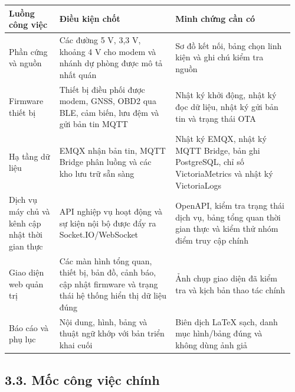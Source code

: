 \documentclass[a4paper]{extarticle}
\newcounter{none} %
\begin{document}
{\def\LTcaptype{none} %
\begin{longtable}{|L{0.170\linewidth}|L{0.390\linewidth}|L{0.400\linewidth}|}
\hline
\textbf{Luồng công việc} & \textbf{Điều kiện chốt} & \textbf{Minh chứng cần có} \\
\hline
\endhead
\endfoot
\endlastfoot
Phần cứng và nguồn & Các đường 5 V, 3,3 V, khoảng 4 V cho modem và nhánh dự phòng được mô tả nhất quán & Sơ đồ kết nối, bảng chọn linh kiện và ghi chú kiểm tra nguồn \\\hline
Firmware thiết bị & Thiết bị điều phối được modem, GNSS, OBD2 qua BLE, cảm biến, lưu đệm và gửi bản tin MQTT & Nhật ký khởi động, nhật ký đọc dữ liệu, nhật ký gửi bản tin và trạng thái OTA \\\hline
Hạ tầng dữ liệu & EMQX nhận bản tin, MQTT Bridge phân luồng và các kho lưu trữ sẵn sàng & Nhật ký EMQX, nhật ký MQTT Bridge, bản ghi PostgreSQL, chỉ số VictoriaMetrics và nhật ký VictoriaLogs \\\hline
Dịch vụ máy chủ và kênh cập nhật thời gian thực & API nghiệp vụ hoạt động và sự kiện nội bộ được đẩy ra Socket.IO/WebSocket & OpenAPI, kiểm tra trạng thái dịch vụ, bảng tổng quan thời gian thực và kiểm thử nhóm điểm truy cập chính \\\hline
Giao diện web quản trị & Các màn hình tổng quan, thiết bị, bản đồ, cảnh báo, cập nhật firmware và trạng thái hệ thống hiển thị dữ liệu đúng & Ảnh chụp giao diện đã kiểm tra và kịch bản thao tác chính \\\hline
Báo cáo và phụ lục & Nội dung, hình, bảng và thuật ngữ khớp với bản triển khai cuối & Biên dịch LaTeX sạch, danh mục hình/bảng đúng và không dùng ảnh giả \\\hline
\end{longtable}
}

\subsection{3.3. Mốc công việc chính}\label{app3-milestones-cap-nhat}
\end{document}
